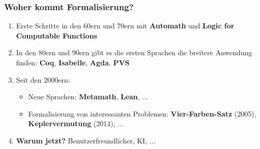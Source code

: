 \documentclass{beamer}
\theoremstyle{definition}
\theoremstyle{remark}
\begin{document}
\begin{frame}
	\frametitle{Woher kommt Formalisierung?}
	\begin{enumerate}
		\item Erste Schritte in den 60ern und 70ern mit \textbf{Automath} und	\textbf{Logic for Computable Functions} 
		\item In den 80ern und 90ern gibt es die ersten Sprachen die breitere Anwendung finden: \textbf{Coq}, \textbf{Isabelle}, \textbf{Agda}, \textbf{PVS}
		\item Seit den 2000ern: 
		\begin{itemize}
		 \item Neue Sprachen: \textbf{Metamath}, \textbf{Lean}, ...
		 \item Formalisierung von interessanten Problemen: \textbf{Vier-Farben-Satz} (2005), \textbf{Keplervermutung} (2014), ...
		\end{itemize}
	 \item \textbf{Warum jetzt?} Benutzerfreundlicher, KI, ... 
	\end{enumerate}
\end{frame}
\end{document}
